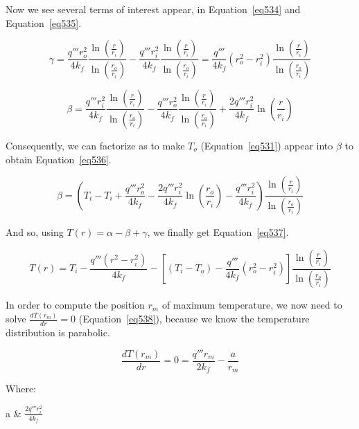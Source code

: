 Now we see several terms of interest appear, in Equation~\ref{eq534} and Equation~\ref{eq535}.

\begin{equation}\label{eq534}
\gamma = \frac{q'''r_o^2}{4k_f}\frac{\ln\left( \frac{r}{r_i} \right)}{\ln \left( \frac{r_o}{r_i} \right)} - \frac{q'''r_i^2}{4k_f}\frac{\ln\left( \frac{r}{r_i} \right)}{\ln \left( \frac{r_o}{r_i} \right)} = \frac{q'''}{4k_f}(r_o^2-r_i^2)\frac{\ln\left( \frac{r}{r_i} \right)}{\ln \left( \frac{r_o}{r_i} \right)}
\end{equation}

\begin{equation}\label{eq535}
\beta = \frac{q'''r_i^2}{4k_f}\frac{\ln\left( \frac{r}{r_i} \right)}{\ln \left( \frac{r_o}{r_i} \right)} - \frac{q'''r_o^2}{4k_f}\frac{\ln\left( \frac{r}{r_i} \right)}{\ln \left( \frac{r_o}{r_i} \right)} + \frac{2q'''r_i^2}{4k_f}\ln\left( \frac{r}{r_i} \right)
\end{equation}

Consequently, we can factorize as to make $T_o$ (Equation~\ref{eq531}) appear into $\beta$ to obtain Equation~\ref{eq536}.

\begin{equation}\label{eq536}
\beta = \left( T_i - T_i + \frac{q'''r_o^2}{4k_f} - \frac{2q'''r_i^2}{4k_f}\ln \left( \frac{r_o}{r_i} \right) - \frac{q'''r_i^2}{4k_f}  \right) \frac{\ln\left( \frac{r}{r_i} \right)}{\ln \left( \frac{r_o}{r_i} \right)}
\end{equation}

And so, using $T(r) = \alpha - \beta + \gamma$, we finally get Equation~\ref{eq537}.

\begin{equation}\label{eq537}
T(r) = T_i - \frac{q'''(r^2 - r_i^2)}{4k_f} - \left[ (T_i - T_o) - \frac{q'''}{4k_f}(r_o^2-r_i^2) \right] \frac{\ln\left( \frac{r}{r_i} \right)}{\ln \left( \frac{r_o}{r_i} \right)}
\end{equation}

In order to compute the position $r_m$ of maximum temperature, we now need to solve $\frac{dT(r_m)}{dr} = 0$ (Equation~\ref{eq538}), because we know the temperature distribution is parabolic.

\begin{equation}\label{eq538}
\frac{dT(r_m)}{dr} = 0 = \frac{q'''r_m}{2k_f} - \frac{a}{r_m}
\end{equation}

Where:

\begin{conditions}
a & $\frac{2q'''r_i^2}{4k_f}$
\end{conditions}

